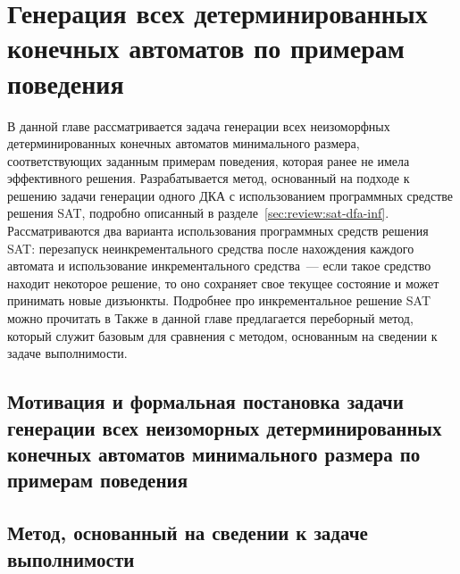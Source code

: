 
\chapter{Генерация всех детерминированных конечных автоматов по примерам поведения} 
\label{sec:findall}

В данной главе рассматривается задача генерации всех неизоморфных детерминированных конечных автоматов минимального размера, соответствующих заданным примерам поведения, которая ранее не имела эффективного решения.
Разрабатывается метод, основанный на подходе к решению задачи генерации одного ДКА с использованием программных средстве решения SAT, подробно описанный в разделе~\ref{sec:review:sat-dfa-inf}.
Рассматриваются два варианта использования программных средств решения SAT: перезапуск неинкрементального средства после нахождения каждого автомата и использование инкрементального средства~{---} если такое средство находит некоторое решение, то оно сохраняет свое текущее состояние и может принимать новые дизъюнкты.
Подробнее про инкрементальное решение SAT можно прочитать в%
Также в данной главе предлагается переборный метод, который служит базовым для сравнения с методом, основанным на сведении к задаче выполнимости.


\section{Мотивация и формальная постановка задачи генерации всех неизоморных детерминированных конечных автоматов минимального размера по примерам поведения}
\label{sec:findall:problem}



\section{Метод, основанный на сведении к задаче выполнимости}
\label{sec:findall:SAT-based}

